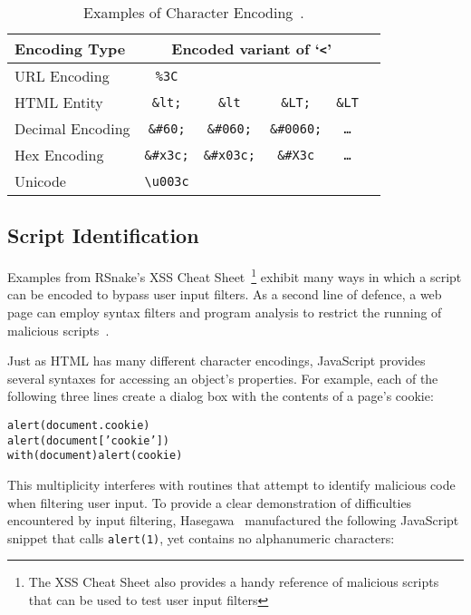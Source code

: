 \begin{table}[ht]
\centering
\begin{tabular}{l|ccccc}
 \textbf{Encoding Type} & \multicolumn{4}{c}{\textbf{Encoded variant of `\texttt{<}'}} \\
 \hline
 URL Encoding           & \texttt{\%3C} &&&\\
 HTML Entity            & \texttt{\&lt;} & \texttt{\&lt} & \texttt{\&LT;} & \texttt{\&LT} \\
 Decimal Encoding       & \texttt{\&\#60;} & \texttt{\&\#060;} & \texttt{\&\#0060;} & \texttt{\ldots} \\
 Hex Encoding           & \texttt{\&\#x3c;} & \texttt{\&\#x03c;} & \texttt{\&\#X3c} & \texttt{\ldots} \\
 Unicode                & \texttt{\textbackslash u003c} &&&\\
\end{tabular}
\caption{Examples of Character Encoding~\cite{secubat}.}
\label{tab:html-encoding}
\end{table}

\subsection{Script Identification}

Examples from RSnake's XSS Cheat Sheet~\cite{xsscheatsheet}\footnote{The XSS Cheat Sheet also provides a handy reference of malicious scripts that can be used to test user input filters} exhibit many ways in which a script can be encoded to bypass user input filters.
As a second line of defence, a web page can employ syntax filters and program analysis to restrict the running of malicious scripts~\cite{browsershield, corescript, webssari}.

Just as HTML has many different character encodings, JavaScript provides several syntaxes for accessing an object's properties.
For example, each of the following three lines create a dialog box with the contents of a page's cookie:

\begin{alltt}
alert(document.cookie)
alert(document['cookie'])
with(document) alert(cookie)
\end{alltt}

This multiplicity interferes with routines that attempt to identify malicious code when filtering user input.
To provide a clear demonstration of difficulties encountered by input filtering, Hasegawa~\cite{xssfilters} manufactured the following JavaScript snippet that calls \texttt{alert(1)}, yet contains no alphanumeric characters:

